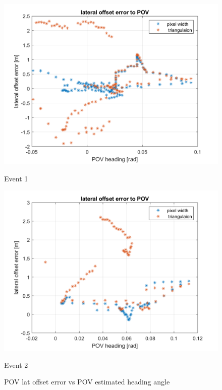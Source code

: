 \begin{figure}[H]
\centering
\begin{minipage}[b]{0.49\textwidth}
    \includegraphics[width=\textwidth]{FiguresMat/range_heading_error_lat_10794257.png}
    \caption*{Event 1}
\end{minipage}
\begin{minipage}[b]{0.5\textwidth}
    \includegraphics[width=\textwidth]{FiguresMat/range_heading_error_lat_116147345.png}
    \caption*{Event 2}
\end{minipage}
\caption{POV lat offset error vs POV estimated heading angle}
\label{fig:lat_offset_error_heading}
\end{figure}

